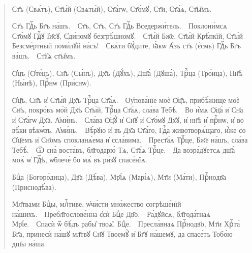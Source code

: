\documentclass[11pt,a4paper,oneside]{memoir}
\newcommand{\exercise}{}
\newcommand{\exquote}{quote}
\newcommand{\pstyle}{\textenglish}
\newcommand{\pxp}[1]{\pstyle{(}#1\pstyle{)}}
\newcommand{\sdash}{\textenglish{\textemdash}}
\begin{document}
\paragraph{\exercise}

\begin{\exquote}\begin{slv}
		Ст҃ъ \pxp{Свѧ́тъ}, Ст҃ы́й \pxp{Свѧты́й}, Ст҃а́гѡ, Ст҃о́мꙋ, Ст҃и, Ст҃а́ѧ, Ст҃ы̑мъ.

		Ст҃ъ Гдⷭ҇ь Бг҃ъ на́шъ.~\sdash~Ст҃ъ, Ст҃ъ, Ст҃ъ Гдⷭ҇ь Вседержи́тель.~\sdash~Поклони́мсѧ Ст҃о́мꙋ Гдⷭ҇ꙋ І҆и҃сꙋ, Є҆ди́номꙋ безгрѣ́шномꙋ.~\sdash~Ст҃ы́й Бж҃е, Ст҃ы́й Крѣ́пкїй, Ст҃ы́й Безсме́ртный поми́лꙋй на́съ!~\sdash~Свѧ́ти бꙋ́дите, ꙗ҆́кѡ А҆́зъ ст҃ъ \pxp{є҆́смь} Гдⷭ҇ь Бг҃ъ ва́шъ.~\sdash~Ст҃а̑ѧ ст҃ы̑мъ.

		Ѻ҆цъ \pxp{Ѻ҆те́цъ}, Сн҃ъ \pxp{Сы́нъ}, Дх҃ъ \pxp{Дꙋ́хъ}, Дш҃а̀ \pxp{Дꙋша̀}, Трⷪ҇ца \pxp{Тро́ица}, Нн҃ѣ \pxp{Ны́нѣ}, Прⷭ҇нѡ \pxp{При́снѡ}.

		Ѻ҆ц҃ъ, Сн҃ъ и҆ Ст҃ы́й Дх҃ъ Трⷪ҇ца Ст҃а́ѧ.~\sdash~Оу҆пова́нїе моѐ Ѻ҆ц҃ъ, прибѣ́жище моѐ Сн҃ъ, покро́въ мо́й Дх҃ъ Ст҃ы́й, Трⷪ҇ца Ст҃а́ѧ, сла́ва Тебѣ̀.~\sdash~Во и҆́мѧ Ѻ҆ц҃а̀ и҆ Сн҃а и҆ Ст҃а́гѡ Дх҃а. А҆ми́нь.~\sdash~Сла́ва Ѻ҆ц҃ꙋ̀ и҆ Сн҃ꙋ и҆ Ст҃о́мꙋ Дх҃ꙋ, и҆ нн҃ѣ и҆ прⷭ҇нѡ, и҆ во вѣ́ки вѣкѡ́въ. А҆ми́нь.~\sdash~Вѣ́рꙋю и҆ въ Дх҃а Ст҃а́го, Гдⷭ҇а животворѧ́щаго, и҆́же со Ѻ҆ц҃емъ и҆ Сн҃омъ спокланѧ́ема и҆ ссла́вима.~\sdash~Прест҃а́ѧ Трⷪ҇це, Бж҃е на́шъ, сла́ва Тебѣ̀.~\sdash~Ѿ сна̀ воста́въ, бл҃годарю̀ Тѧ, Ст҃а́ѧ Трⷪ҇це.~\sdash~Да возра́дꙋетсѧ дш҃а̀ моѧ̀ ѡ҆ Гдⷭ҇ѣ, ѡ҆блече́ бо мѧ̀ въ ри́зꙋ спасе́нїѧ.

		Бцⷣа \pxp{Богоро́дица}, Дв҃а \pxp{Дѣ́ва}, Мр҃і́ѧ \pxp{Марі́ѧ}, Мт҃и \pxp{Ма́ти}, Прⷭ҇нодв҃а \pxp{Приснодѣ́ва}.

		Мл҃твами Бцⷣы, млⷭ҇тиве, ѡ҆чи́сти мно́жество согрѣше́нїй на́шихъ.~\sdash~Пребл҃гослове́нна є҆сѝ Бцⷣе Дв҃о.~\sdash~Ра́дꙋйсѧ, бл҃года́тнаѧ Мр҃і́е.~\sdash~Спасѝ ѿ бѣ́дъ рабы̑ твоѧ̑, Бцⷣе.~\sdash~Пресла́внаѧ Прⷭ҇нодв҃о, Мт҃и Хрⷭ҇та̀ Бг҃а, принесѝ на́шꙋ мл҃твꙋ Сн҃ꙋ Твоемꙋ̀ и҆ Бг҃ꙋ на́шемꙋ, да спасе́тъ Тобо́ю дш҃ы на́ша.
	\end{slv}\end{\exquote}
\medskip

\paragraph{\exercise}
\end{document}
